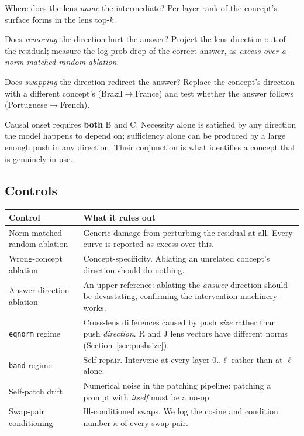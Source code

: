 \documentclass[11pt,a4paper]{article}
\begin{document}
\begin{description}[leftmargin=1.4em,style=nextline]
\item[Measurement A --- readout.] Where does the lens \emph{name} the intermediate?
  Per-layer rank of the concept's surface forms in the lens top-$k$.

\item[Measurement B --- necessity.] Does \emph{removing} the direction hurt the answer?
  Project the lens direction out of the residual; measure the log-prob drop of the
  correct answer, as \emph{excess over a norm-matched random ablation}.

\item[Measurement C --- sufficiency.] Does \emph{swapping} the direction redirect the
  answer? Replace the concept's direction with a different concept's (Brazil$\to$France)
  and test whether the answer follows (Portuguese$\to$French).
\end{description}

\noindent
Causal onset requires \textbf{both} B and C. Necessity alone is satisfied by any
direction the model happens to depend on; sufficiency alone can be produced by a
large enough push in any direction. Their conjunction is what identifies a concept
that is genuinely in use.

\subsection{Controls}

\begin{longtable}{@{}p{}p{}@{}}
\toprule
\textbf{Control} & \textbf{What it rules out} \\
\midrule \endhead
Norm-matched random ablation & Generic damage from perturbing the residual at all.
  Every curve is reported as excess over this. \\
\addlinespace
Wrong-concept ablation & Concept-specificity. Ablating an unrelated concept's
  direction should do nothing. \\
\addlinespace
Answer-direction ablation & An upper reference: ablating the \emph{answer} direction
  should be devastating, confirming the intervention machinery works. \\
\addlinespace
\texttt{eqnorm} regime & Cross-lens differences caused by push \emph{size} rather than
  push \emph{direction}. R and J lens vectors have different norms
  (Section~\ref{sec:pushsize}). \\
\addlinespace
\texttt{band} regime & Self-repair. Intervene at every layer $0..\ell$ rather than at
  $\ell$ alone. \\
\addlinespace
Self-patch drift & Numerical noise in the patching pipeline: patching a prompt with
  \emph{itself} must be a no-op. \\
\addlinespace
Swap-pair conditioning & Ill-conditioned swaps. We log the cosine and condition number
  $\kappa$ of every swap pair. \\
\bottomrule
\end{longtable}
\end{document}
